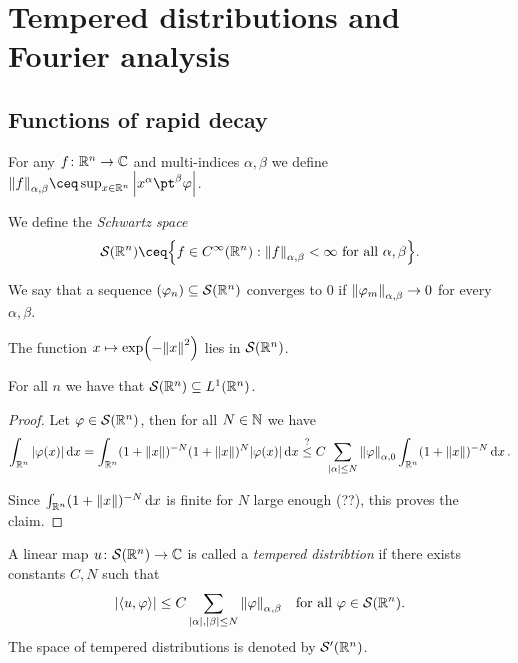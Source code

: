 
\section{Tempered distributions and Fourier analysis}
\subsection{Functions of rapid decay}
\begin{definition}
	For any $f \colon \mathbb R^n \to \mathbb C$ and multi-indices $\alpha, \beta$ we define $\norm{f}_{\alpha, \beta} \ceq \sup_{x \in \RR^n} \abs{x^\alpha \pt^\beta\phi}$. 
	
	We define the \emph{Schwartz space}
	\[
	\Cal S(\RR^n) \ceq \qty{f \in C^\infty(\RR^n) : \norm{f}_{\alpha, \beta} < \infty \text{ for all $\alpha, \beta$}}.
	\]
	
	We say that a sequence $(\varphi_n) \subseteq \mathcal S(\mathbb R^n)$ converges to 0 if $\norm{\varphi_m}_{\alpha, \beta} \to 0$ for every $\alpha, \beta$.  
\end{definition}

\begin{example}
	The function $x \mapsto \exp(-\norm{x}^2)$ lies in $\mathcal S(\mathbb R^n)$. 
\end{example}

\begin{proposition}
	For all $n$ we have that $\mathcal S(\mathbb R^n) \subseteq L^1(\mathbb R^n)$. 
\end{proposition}

\begin{proof}
	Let $\varphi \in \mathcal S(\mathbb R^n)$, then for all $N \in \mathbb N$ we have
	\[
	\int_{\mathbb R^n} \abs{\varphi(x)} \dd{x} = \int_{\mathbb R^n} (1 + \norm{x})^{-N} (1 + \norm{x})^N \abs{\varphi(x)} \dd{x} \overset?\leq C\sum_{\abs{\alpha} \leq N} \norm{\varphi}_{\alpha, 0} \int_{\mathbb R^n} (1 + \norm{x})^{-N} \dd{x}.
	\]
	
	Since $\int_{\mathbb R^n} (1 + \norm{x})^{-N} \dd{x}$ is finite for $N$ large enough (??), this proves the claim. 
\end{proof}


\begin{definition}
	A linear map $u \colon \mathcal S(\mathbb R^n) \to \mathbb C$ is called a \emph{tempered distribtion} if there exists constants $C, N$ such that
	\[
	\abs{\langle u, \varphi\rangle} \leq C \sum_{\abs{\alpha}, \abs{\beta} \leq N} \norm{\varphi}_{\alpha, \beta} \quad\text{for all $\varphi \in \mathcal S(\mathbb R^n)$}. 
	\]
	The space of tempered distributions is denoted by $\mathcal S'(\mathbb R^n)$. 
\end{definition}

